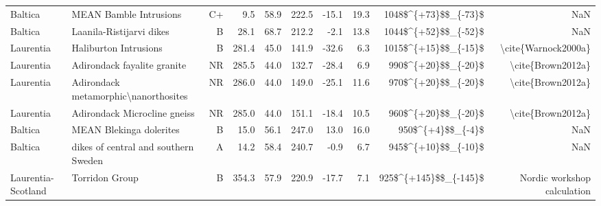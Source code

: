 \begin{longtable}{p{1 in}p{1 in}rrrrrrrr}
                       Baltica &                             MEAN Bamble Intrusions &     C+ &       9.5 &      58.9 & 222.5 & -15.1 &      19.3 &   1048\$\textasciicircum \{+73\}\$\$\_\{-73\}\$ &                                                NaN \\
                       Baltica &                           Laanila-Ristijarvi dikes &      B &      28.1 &      68.7 & 212.2 &  -2.1 &      13.8 &   1044\$\textasciicircum \{+52\}\$\$\_\{-52\}\$ &                                                NaN \\
                     Laurentia &                              Haliburton Intrusions &      B &     281.4 &      45.0 & 141.9 & -32.6 &       6.3 &   1015\$\textasciicircum \{+15\}\$\$\_\{-15\}\$ &                                \textbackslash cite\{Warnock2000a\} \\
                     Laurentia &                        Adirondack fayalite granite &     NR &     285.5 &      44.0 & 132.7 & -28.4 &       6.9 &    990\$\textasciicircum \{+20\}\$\$\_\{-20\}\$ &                                  \textbackslash cite\{Brown2012a\} \\
                     Laurentia &               Adirondack metamorphic\textbackslash nanorthosites &     NR &     286.0 &      44.0 & 149.0 & -25.1 &      11.6 &    970\$\textasciicircum \{+20\}\$\$\_\{-20\}\$ &                                  \textbackslash cite\{Brown2012a\} \\
                     Laurentia &                       Adirondack Microcline gneiss &     NR &     285.0 &      44.0 & 151.1 & -18.4 &      10.5 &    960\$\textasciicircum \{+20\}\$\$\_\{-20\}\$ &                                  \textbackslash cite\{Brown2012a\} \\
                       Baltica &                            MEAN Blekinga dolerites &      B &      15.0 &      56.1 & 247.0 &  13.0 &      16.0 &      950\$\textasciicircum \{+4\}\$\$\_\{-4\}\$ &                                                NaN \\
                       Baltica &               dikes of central and southern Sweden &      A &      14.2 &      58.4 & 240.7 &  -0.9 &       6.7 &    945\$\textasciicircum \{+10\}\$\$\_\{-10\}\$ &                                                NaN \\
            Laurentia-Scotland &                                     Torridon Group &      B &     354.3 &      57.9 & 220.9 & -17.7 &       7.1 &  925\$\textasciicircum \{+145\}\$\$\_\{-145\}\$ &                        Nordic workshop calculation \\

\end{longtable}
